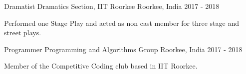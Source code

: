\begin{cventries}
  \cventry
    {Dramatist} %
    {Dramatics Section, IIT Roorkee} %
    {Roorkee, India} %
    {2017 - 2018} %
    {
      \begin{cvitems} %
        \item {Performed one Stage Play and acted as non cast member for three stage and street plays.}
      \end{cvitems}
    }
    
  \cventry
    {Programmer} %
    {Programming and Algorithms Group} %
    {Roorkee, India} %
    {2017 - 2018} %
    {
      \begin{cvitems} %
        \item {Member of the Competitive Coding club based in IIT Roorkee.}
      \end{cvitems}
    }

\end{cventries}
